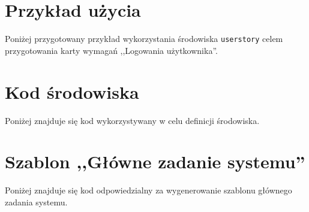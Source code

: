 \section{Przykład użycia}
\label{sec:dodatekApu}
Poniżej przygotowany przykład wykorzystania środowiska \texttt{userstory} celem przygotowania karty wymagań ,,Logowania użytkownika''.


\section{Kod środowiska}
\label{sec:dodatekAks}
Poniżej znajduje się kod wykorzystywany w celu definicji środowiska.


\section{Szablon ,,Główne zadanie systemu''}
\label{sec:dodatekAsgzs}
Poniżej znajduje się kod odpowiedzialny za wygenerowanie szablonu głównego zadania systemu.

